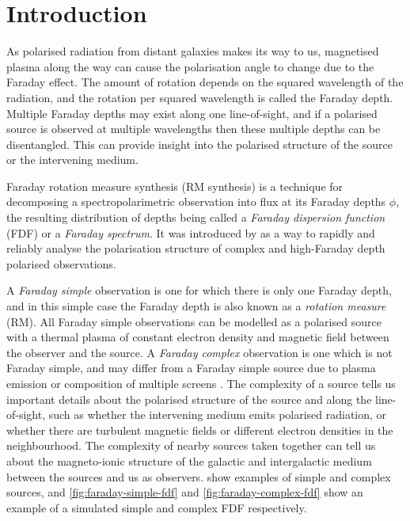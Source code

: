 \documentclass[11pt, a4paper]{book}
\newcommand{\defn}[1]{\emph{#1}}
\begin{document}
\section{Introduction}
\label{sec:faraday-intro}

  As polarised radiation from distant galaxies makes its way to us, magnetised plasma along the way can cause the polarisation angle to change due to the Faraday effect. The amount of rotation depends on the squared wavelength of the radiation, and the rotation per squared wavelength is called the Faraday depth. Multiple Faraday depths may exist along one line-of-sight, and if a polarised source is observed at multiple wavelengths then these multiple depths can be disentangled. This can provide insight into the polarised structure of the source or the intervening medium.

  Faraday rotation measure synthesis (RM synthesis) is a technique for decomposing a spectropolarimetric observation into flux at its Faraday depths $\phi$, the resulting distribution of depths being called a \defn{Faraday dispersion function} (FDF) or a \defn{Faraday spectrum}. It was introduced by \citet{brentjens_faraday_2005} as a way to rapidly and reliably analyse the polarisation structure of complex and high-Faraday depth polarised observations.

  A \defn{Faraday simple} observation is one for which there is only one Faraday depth, and in this simple case the Faraday depth is also known as a \defn{rotation measure} (RM). All Faraday simple observations can be modelled as a polarised source with a thermal plasma of constant electron density and magnetic field \citep[a `Faraday screen';][]{brentjens_faraday_2005,anderson_broadband_2015} between the observer and the source. A \defn{Faraday complex} observation is one which is not Faraday simple, and may differ from a Faraday simple source due to plasma emission or composition of multiple screens \citep{brentjens_faraday_2005}. The complexity of a source tells us important details about the polarised structure of the source and along the line-of-sight, such as whether the intervening medium emits polarised radiation, or whether there are turbulent magnetic fields or different electron densities in the neighbourhood. The complexity of nearby sources taken together can tell us about the magneto-ionic structure of the galactic and intergalactic medium between the sources and us as observers. \citet{osullivan_broad-band_2017} show examples of simple and complex sources, and \autoref{fig:faraday-simple-fdf} and \autoref{fig:faraday-complex-fdf} show an example of a simulated simple and complex FDF respectively.
\end{document}
